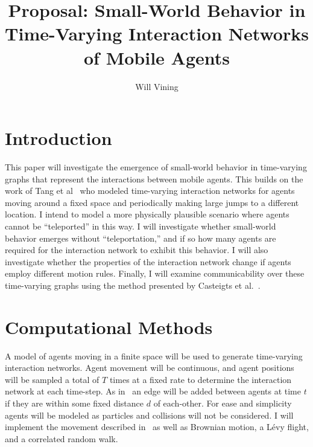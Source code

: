 \documentclass{article}
\title{Proposal: Small-World Behavior in Time-Varying Interaction Networks of
  Mobile Agents}
\author{Will Vining}
\begin{document}
\maketitle

\section{Introduction}
This paper will investigate the emergence of small-world behavior in
time-varying graphs that represent the interactions between mobile
agents. This builds on the work of Tang et al~\cite{Tang2010} who
modeled time-varying interaction networks for agents moving around a
fixed space and periodically making large jumps to a different
location. I intend to model a more physically plausible scenario where
agents cannot be ``teleported'' in this way. I will investigate
whether small-world behavior emerges without ``teleportation,'' and if
so how many agents are required for the interaction network to exhibit
this behavior. I will also investigate whether the properties of the
interaction network change if agents employ different motion
rules. Finally, I will examine communicability over these time-varying
graphs using the method presented by Casteigts et
al.~\cite{Grindrod2011}.

\section{Computational Methods}
\label{sec:comp-methods}
A model of agents moving in a finite space will be used to generate
time-varying interaction networks. Agent movement will be continuous,
and agent positions will be sampled a total of $T$ times at a fixed
rate to determine the interaction network at each time-step. As
in~\cite{Tang2010} an edge will be added between agents at time $t$ if
they are within some fixed distance $d$ of each-other. For ease and
simplicity agents will be modeled as particles and collisions will not
be considered.  I will implement the movement described
in~\cite{Tang2010} as well as Brownian motion, a L{\'e}vy flight, and
a correlated random walk.

\end{document}
